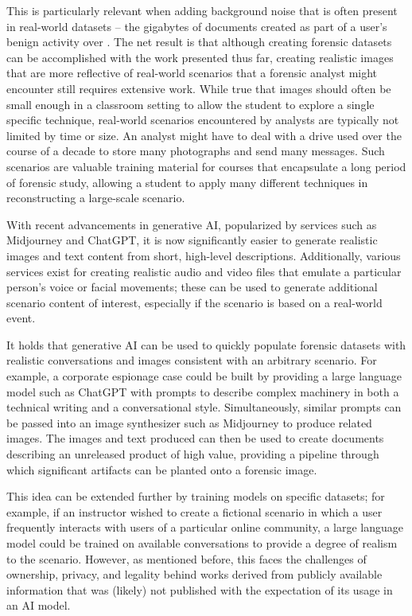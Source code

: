 This is particularly relevant when adding background noise that is often
present in real-world datasets -- the gigabytes of documents created as
part of a user's benign activity over . The net result is that although
creating forensic datasets can be accomplished with the work presented
thus far, creating realistic images that are more reflective of
real-world scenarios that a forensic analyst might encounter still
requires extensive work. While true that images should often be small
enough in a classroom setting to allow the student to explore a single
specific technique, real-world scenarios encountered by analysts are
typically not limited by time or size. An analyst might have to deal
with a drive used over the course of a decade to store many photographs
and send many messages. Such scenarios are valuable training material
for courses that encapsulate a long period of forensic study, allowing a
student to apply many different techniques in reconstructing a
large-scale scenario.

With recent advancements in generative AI, popularized by services such
as Midjourney and ChatGPT, it is now significantly easier to generate
realistic images and text content from short, high-level descriptions.
Additionally, various services exist for creating realistic audio and
video files that emulate a particular person's voice or facial
movements; these can be used to generate additional scenario content of
interest, especially if the scenario is based on a real-world event.

It holds that generative AI can be used to quickly populate forensic
datasets with realistic conversations and images consistent with an
arbitrary scenario. For example, a corporate espionage case could be
built by providing a large language model such as ChatGPT with prompts
to describe complex machinery in both a technical writing and a
conversational style. Simultaneously, similar prompts can be passed into
an image synthesizer such as Midjourney to produce related images. The
images and text produced can then be used to create documents describing
an unreleased product of high value, providing a pipeline through which
significant artifacts can be planted onto a forensic image.

This idea can be extended further by training models on specific
datasets; for example, if an instructor wished to create a fictional
scenario in which a user frequently interacts with users of a particular
online community, a large language model could be trained on available
conversations to provide a degree of realism to the scenario. However,
as mentioned before, this faces the challenges of ownership, privacy,
and legality behind works derived from publicly available information
that was (likely) not published with the expectation of its usage in an
AI model.

